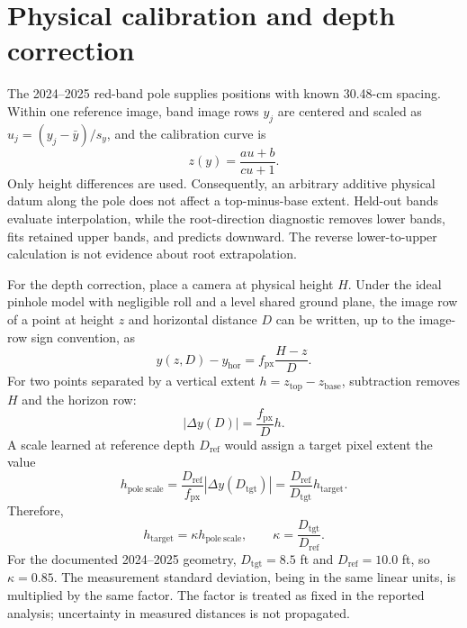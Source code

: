 \documentclass[review,12pt,authoryear]{elsarticle}
\begin{document}
\section{Physical calibration and depth correction}
\label{sec:s-calibration}

The 2024--2025 red-band pole supplies positions with known 30.48-cm spacing. Within one reference image, band image rows $y_j$ are centered and scaled as $u_j=(y_j-\bar y)/s_y$, and the calibration curve is
\begin{equation}
z(y)=\frac{au+b}{cu+1}.
\label{eq:s-projective}
\end{equation}
Only height differences are used. Consequently, an arbitrary additive physical datum along the pole does not affect a top-minus-base extent. Held-out bands evaluate interpolation, while the root-direction diagnostic removes lower bands, fits retained upper bands, and predicts downward. The reverse lower-to-upper calculation is not evidence about root extrapolation.

For the depth correction, place a camera at physical height $H$. Under the ideal pinhole model with negligible roll and a level shared ground plane, the image row of a point at height $z$ and horizontal distance $D$ can be written, up to the image-row sign convention, as
\begin{equation}
y(z,D)-y_{\mathrm{hor}}=f_{\mathrm{px}}\frac{H-z}{D}.
\label{eq:s-pinhole}
\end{equation}
For two points separated by a vertical extent $h=z_{\mathrm{top}}-z_{\mathrm{base}}$, subtraction removes $H$ and the horizon row:
\begin{equation}
\left|\Delta y(D)\right|=\frac{f_{\mathrm{px}}}{D}h.
\label{eq:s-extent}
\end{equation}
A scale learned at reference depth $D_{\mathrm{ref}}$ would assign a target pixel extent the value
\begin{equation}
h_{\mathrm{pole\ scale}}
=\frac{D_{\mathrm{ref}}}{f_{\mathrm{px}}}\left|\Delta y(D_{\mathrm{tgt}})\right|
=\frac{D_{\mathrm{ref}}}{D_{\mathrm{tgt}}}h_{\mathrm{target}}.
\label{eq:s-depth-bias}
\end{equation}
Therefore,
\begin{equation}
h_{\mathrm{target}}
=\kappa h_{\mathrm{pole\ scale}},
\qquad
\kappa=\frac{D_{\mathrm{tgt}}}{D_{\mathrm{ref}}}.
\label{eq:s-depth-correction}
\end{equation}
For the documented 2024--2025 geometry, $D_{\mathrm{tgt}}=8.5$ ft and $D_{\mathrm{ref}}=10.0$ ft, so $\kappa=0.85$. The measurement standard deviation, being in the same linear units, is multiplied by the same factor. The factor is treated as fixed in the reported analysis; uncertainty in measured distances is not propagated.
\end{document}
